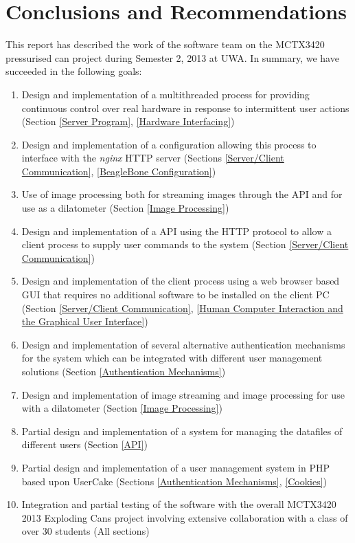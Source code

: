 \chapter{Conclusions and Recommendations}\label{Conclusions and Recommendations}

This report has described the work of the software team on the MCTX3420 pressurised can project during Semester 2, 2013 at UWA.
In summary, we have succeeded in the following goals:

\begin{enumerate}
	\item Design and implementation of a multithreaded process for providing continuous control over real hardware in response to intermittent user actions (Section \ref{Server Program}, \ref{Hardware Interfacing})
	\item Design and implementation of a configuration allowing this process to interface with the \emph{nginx} HTTP server (Sections \ref{Server/Client Communication}, \ref{BeagleBone Configuration})
	\item Use of image processing both for streaming images through the API and for use as a dilatometer (Section \ref{Image Processing})
	\item Design and implementation of a API using the HTTP protocol to allow a client process to supply user commands to the system (Section \ref{Server/Client Communication})
	\item Design and implementation of the client process using a web browser based GUI that requires no additional software to be installed on the client PC (Section \ref{Server/Client Communication}, \ref{Human Computer Interaction and the Graphical User Interface})
	\item Design and implementation of several alternative authentication mechanisms for the system which can be integrated with different user management solutions (Section \ref{Authentication Mechanisms})
	\item Design and implementation of image streaming and image processing for use with a dilatometer (Section \ref{Image Processing})
	\item Partial design and implementation of a system for managing the datafiles of different users (Section \ref{API})
	\item Partial design and implementation of a user management system in PHP based upon UserCake (Sections \ref{Authentication Mechanisms}, \ref{Cookies})
	\item Integration and partial testing of the software with the overall MCTX3420 2013 Exploding Cans project involving extensive collaboration with a class of over 30 students (All sections)
\end{enumerate}

